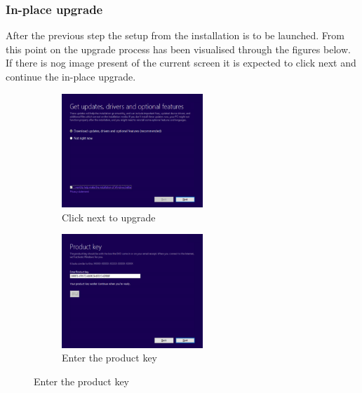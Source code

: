 \subsubsection{In-place upgrade}
After the previous step the setup from the installation is to be launched. From this point on the upgrade process has been visualised through the figures below. If there is nog image present of the current screen it is expected to click next and continue the in-place upgrade.
\begin{figure}[h]
	\begin{subfigure}{0.5\textwidth}
		\includegraphics[width=0.9\linewidth,height=4.3cm]{img/In-Place_WS_2.png}
		\captionsetup{width=0.8\linewidth}
		\centering		
		\caption{Click next to upgrade}
		\label{fig:inplace2}
	\end{subfigure}
	\begin{subfigure}{0.5\textwidth}
		\captionsetup{width=0.8\linewidth}
		\includegraphics[width=0.9\linewidth,height=4.3cm]{img/In-Place_WS_3.png}
		\centering
		\caption{Enter the product key}
		\label{fig:inplace3}
	\end{subfigure}
\end{figure}
